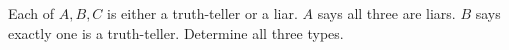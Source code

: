 Each of $A,B,C$ is either a truth-teller or a liar. $A$ says all three are liars. $B$ says exactly one is a truth-teller. Determine all three types.
